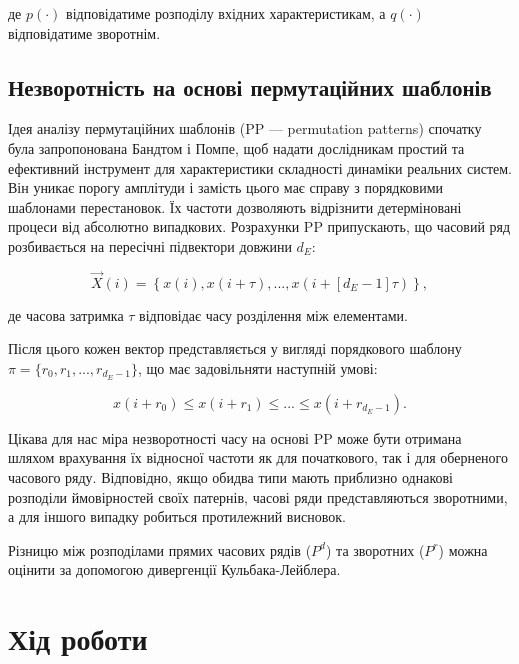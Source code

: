 \documentclass[
  letterpaper,
]{report}
\begin{document}
де \(p(\cdot)\) відповідатиме розподілу вхідних характеристикам, а
\(q(\cdot)\) відповідатиме зворотнім.

\hypertarget{ux43dux435ux437ux432ux43eux440ux43eux442ux43dux456ux441ux442ux44c-ux43dux430-ux43eux441ux43dux43eux432ux456-ux43fux435ux440ux43cux443ux442ux430ux446ux456ux439ux43dux438ux445-ux448ux430ux431ux43bux43eux43dux456ux432}{%
\subsection{Незворотність на основі пермутаційних
шаблонів}\label{ux43dux435ux437ux432ux43eux440ux43eux442ux43dux456ux441ux442ux44c-ux43dux430-ux43eux441ux43dux43eux432ux456-ux43fux435ux440ux43cux443ux442ux430ux446ux456ux439ux43dux438ux445-ux448ux430ux431ux43bux43eux43dux456ux432}}

Ідея аналізу пермутаційних шаблонів (PP --- permutation patterns)
спочатку була запропонована Бандтом і Помпе, щоб надати дослідникам
простий та ефективний інструмент для характеристики складності динаміки
реальних систем. Він уникає порогу амплітуди і замість цього має справу
з порядковими шаблонами перестановок. Їх частоти дозволяють відрізнити
детерміновані процеси від абсолютно випадкових. Розрахунки PP
припускають, що часовий ряд розбивається на пересічні підвектори довжини
\(d_{E}\):

\[ 
\vec{X}(i) = \left\{ x(i), x(i+\tau), ... , x(i+[d_{E}-1]\tau) \right\}, 
\]

де часова затримка \(\tau\) відповідає часу розділення між елементами.

Після цього кожен вектор представляється у вигляді порядкового шаблону
\(\pi = \{ r_0, r_1, ... , r_{d_{E}-1} \}\), що має задовільняти
наступній умові:

\[ 
x(i+r_0) \leq x(i+r_1) \leq ... \leq x(i+r_{d_{E}-1}).
\]

Цікава для нас міра незворотності часу на основі PP може бути отримана
шляхом врахування їх відносної частоти як для початкового, так і для
оберненого часового ряду. Відповідно, якщо обидва типи мають приблизно
однакові розподіли ймовірностей своїх патернів, часові ряди
представляються зворотними, а для іншого випадку робиться протилежний
висновок.

Різницю між розподілами прямих часових рядів (\(P^{d}\)) та зворотних
(\(P^{r}\)) можна оцінити за допомогою дивергенції Кульбака-Лейблера.

\hypertarget{ux445ux456ux434-ux440ux43eux431ux43eux442ux438-6}{%
\section{Хід
роботи}\label{ux445ux456ux434-ux440ux43eux431ux43eux442ux438-6}}
\end{document}
